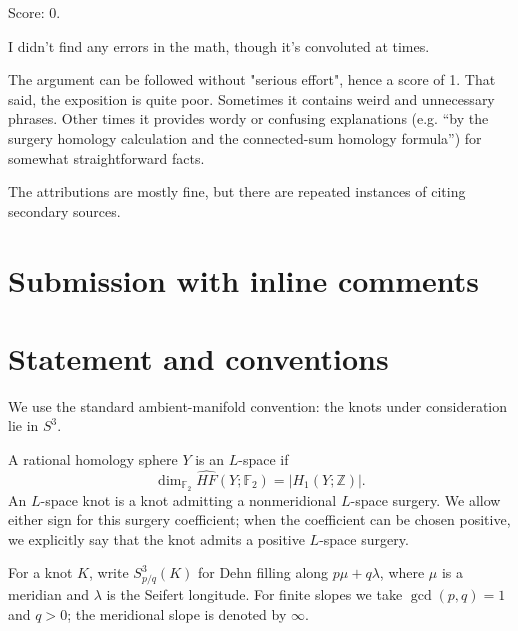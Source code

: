 \documentclass[11pt]{article}
\newcommand{\Z}{\mathbb{Z}}
\newcommand{\F}{\mathbb{F}_2}
\newcommand{\surg}[2]{S^3_{#1}(#2)}
\begin{document}
\noindent Score: 0. 

 I didn't find any errors in the math, though it's convoluted at times.

The argument can be followed without "serious effort", hence a score of 1. That said, the exposition is quite poor. Sometimes it contains weird and unnecessary phrases. Other times it provides wordy or confusing explanations (e.g. ``by the surgery homology calculation and the
connected-sum homology formula'') for somewhat straightforward facts. 

The attributions are mostly fine, but there are repeated instances of citing secondary sources. 

\newpage
\section{Submission with inline comments}


\begin{abstract}
Every Dehn surgery on an \(L\)-space knot in \(S^3\) has at most two
nontrivial prime summands. We prove this using established results about
reducing slopes and prime decompositions, together with a
group-theoretic genus bound for integer homology sphere summands of
surgeries on fibered knots.
\end{abstract}

\section{Statement and conventions}

We use the standard ambient-manifold convention: the knots under
consideration lie in \(S^3\). 

A rational homology sphere \(Y\) is an
\(L\)-space if
\[
    \dim_{\F}\widehat{HF}(Y;\F)=|H_1(Y;\Z)|.
\]
An \(L\)-space knot is a knot admitting a nonmeridional \(L\)-space
surgery. We allow either sign for this surgery coefficient; when the
coefficient can be chosen positive, we explicitly say that the knot
admits a positive \(L\)-space surgery.

For a knot \(K\), write \(\surg{p/q}{K}\) for Dehn filling along
\(p\mu+q\lambda\), where \(\mu\) is a meridian and \(\lambda\) is the
Seifert longitude. For finite slopes we take \(\gcd(p,q)=1\) and \(q>0\);
the meridional slope is denoted by \(\infty\).
\end{document}
